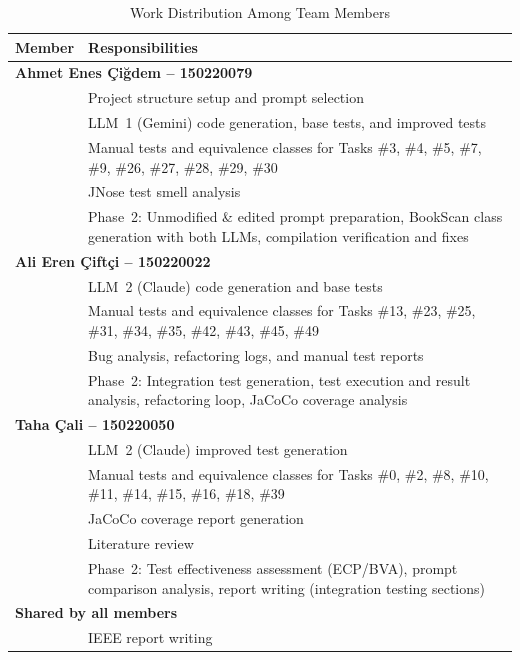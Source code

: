 \documentclass[12pt, a4paper]{article}
\begin{document}
\begin{table}[H]
\centering
\caption{Work Distribution Among Team Members}
\label{tab:work-distribution}
\begin{tabularx}{\textwidth}{l X}
\toprule
\textbf{Member} & \textbf{Responsibilities} \\
\midrule
\multicolumn{2}{l}{\textbf{Ahmet Enes \c{C}i\u{g}dem -- 150220079}} \\
& Project structure setup and prompt selection \\
& LLM~1 (Gemini) code generation, base tests, and improved tests \\
& Manual tests and equivalence classes for Tasks \#3, \#4, \#5, \#7, \#9, \#26, \#27, \#28, \#29, \#30 \\
& JNose test smell analysis \\
& Phase~2: Unmodified \& edited prompt preparation, BookScan class generation with both LLMs, compilation verification and fixes \\
\midrule
\multicolumn{2}{l}{\textbf{Ali Eren \c{C}ift\c{c}i -- 150220022}} \\
& LLM~2 (Claude) code generation and base tests \\
& Manual tests and equivalence classes for Tasks \#13, \#23, \#25, \#31, \#34, \#35, \#42, \#43, \#45, \#49 \\
& Bug analysis, refactoring logs, and manual test reports \\
& Phase~2: Integration test generation, test execution and result analysis, refactoring loop, JaCoCo coverage analysis \\
\midrule
\multicolumn{2}{l}{\textbf{Taha \c{C}ali -- 150220050}} \\
& LLM~2 (Claude) improved test generation \\
& Manual tests and equivalence classes for Tasks \#0, \#2, \#8, \#10, \#11, \#14, \#15, \#16, \#18, \#39 \\
& JaCoCo coverage report generation \\
& Literature review \\
& Phase~2: Test effectiveness assessment (ECP/BVA), prompt comparison analysis, report writing (integration testing sections) \\
\midrule
\multicolumn{2}{l}{\textbf{Shared by all members}} \\
& IEEE report writing \\
\bottomrule
\end{tabularx}
\end{table}
\end{document}
